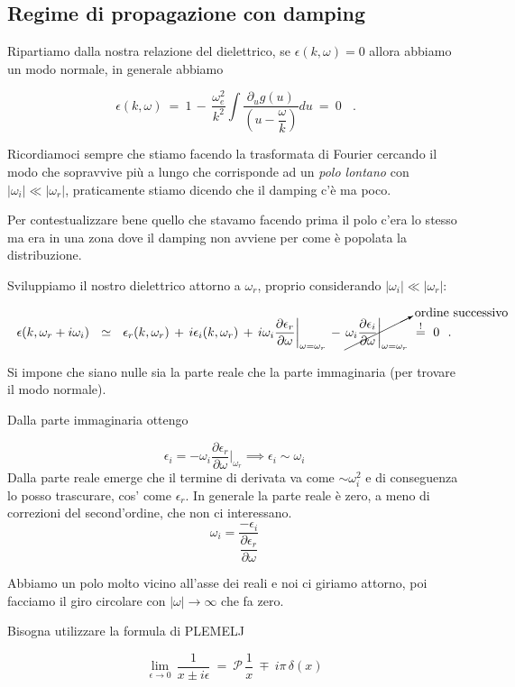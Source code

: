 %
%
%
\subsection{Regime di propagazione con damping}  

Ripartiamo dalla nostra relazione del dielettrico, se $\epsilon(k,\omega)=0$ allora abbiamo un modo normale, in generale abbiamo

\[\boxed{\ \epsilon(k,\omega)\ =\ 1\,-\,\frac{\omega_e^2}{k^2}\int\frac{\partial_ug(u)}{(u-\dfrac{\omega}{k})}du\ =\ 0\ }\ \ \ .\] 

Ricordiamoci sempre che stiamo facendo la trasformata di Fourier cercando il modo che sopravvive più a lungo che corrisponde ad un \textit{polo lontano} con $|\omega_i|\ll|\omega_r|$, praticamente stiamo dicendo che il damping c'è ma poco. 

Per contestualizzare bene quello che stavamo facendo prima il polo c'era lo stesso ma era in una zona dove il damping non avviene per come è popolata la distribuzione. 

Sviluppiamo il nostro dielettrico attorno a $\omega_r$, proprio considerando $|\omega_i|\ll|\omega_r|$: 

\[\epsilon(k,\omega_r+i\omega_i)\ \ \simeq\ \ \epsilon_r(k,\omega_r)\, +\, i\epsilon_i(k,\omega_r)\, +\, i\omega_i\frac{\partial \epsilon_r}{\partial\omega}\bigg|_{\omega=\omega_r}\, -\, \cancelto{\text{ordine successivo}}{\omega_i\frac{\partial \epsilon_i}{\partial\omega}\bigg|_{\omega=\omega_r}}\ \overset{!}{=}\ 0\ \ .\] 

Si impone che siano nulle sia la parte reale che la parte immaginaria (per trovare il modo normale). 

Dalla parte immaginaria ottengo 

\[\epsilon_i=-\omega_i\frac{\partial\epsilon_r}{\partial \omega}\bigg|_{\omega_r}\implies \epsilon_i\sim\omega_i\] 
Dalla parte reale emerge che il termine di derivata va come $\sim \omega_i^2$ e di conseguenza lo posso trascurare, cos' come $\epsilon_r$. In generale la parte reale è zero, a meno di correzioni del second'ordine, che non ci interessano. 
\[\omega_i=\dfrac{-\epsilon_i}{\dfrac{\partial \epsilon_r}{\partial \omega}}\] 

Abbiamo un polo molto vicino all'asse dei reali e noi ci giriamo attorno, poi facciamo il giro circolare con $|\omega|\to\infty$ che fa zero.

Bisogna utilizzare la formula di PLEMELJ

\[\lim_{\epsilon\to0}\,\frac{1}{x\pm i\epsilon}\ =\ \mathcal P\,\frac{1}{x}\ \mp\ i\pi\,\delta(x)\]
 
